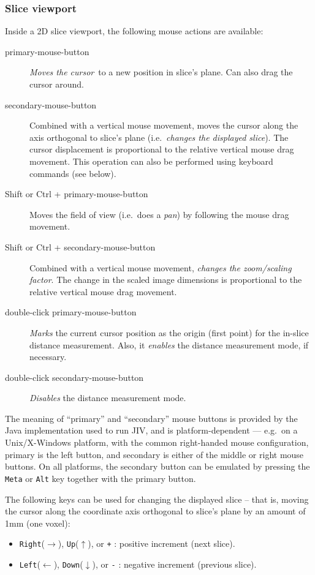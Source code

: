 \subsubsection{Slice viewport}

Inside a 2D slice viewport, the following mouse actions are available:
\begin{description}
\item[primary-mouse-button] {\em Moves the cursor}\ to a new position
  in slice's plane. Can also drag the cursor around.
\item[secondary-mouse-button] Combined with a vertical mouse movement,
  moves the cursor along the axis orthogonal to slice's plane
  (i.e.\ {\em changes the displayed slice}). The cursor displacement
  is proportional to the relative vertical mouse drag movement. This
  operation can also be performed using keyboard commands (see below).
\item[Shift or Ctrl + primary-mouse-button] Moves the field of view
  (i.e.\ does a {\em pan}) by following the mouse drag movement.
\item[Shift or Ctrl + secondary-mouse-button] Combined with a vertical
  mouse movement, {\em changes the zoom/scaling factor}.  The change
  in the scaled image dimensions is proportional to the relative
  vertical mouse drag movement.
\item[double-click primary-mouse-button] {\em Marks} the current
  cursor position as the origin (first point) for the in-slice
  distance measurement. Also, it {\em enables} the distance measurement
  mode, if necessary.
\item[double-click secondary-mouse-button] {\em Disables} the distance
  measurement mode.
\end{description}
The meaning of ``primary'' and ``secondary'' mouse buttons is provided
by the Java implementation used to run JIV, and is platform-dependent
--- e.g.\ on a Unix/X-Windows platform, with the common right-handed
mouse configuration, primary is the left button, and secondary is
either of the middle or right mouse buttons.  On all platforms, the
secondary button can be emulated by pressing the \verb+Meta+ or
\verb+Alt+ key together with the primary button.

The following keys can be used for changing the displayed slice --
that is, moving the cursor along the coordinate axis orthogonal to
slice's plane by an amount of 1mm (one voxel):
\begin{itemize}
\item \verb+Right+($\rightarrow$), \verb+Up+($\uparrow$), or \verb|+|
  : positive increment (next slice).
\item \verb+Left+($\leftarrow$), \verb+Down+($\downarrow$), or
  \verb|-| : negative increment (previous slice).
\end{itemize}

